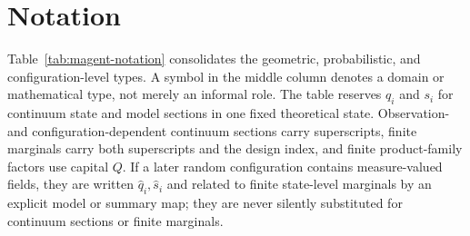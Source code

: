 \chapter{Notation}

Table~\ref{tab:magent-notation} consolidates the geometric, probabilistic, and configuration-level types. A symbol in the middle column denotes a domain or mathematical type, not merely an informal role. The table reserves \(q_i\) and \(s_i\) for continuum state and model sections in one fixed theoretical state. Observation- and configuration-dependent continuum sections carry superscripts, finite marginals carry both superscripts and the design index, and finite product-family factors use capital \(Q\). If a later random configuration contains measure-valued fields, they are written \(\widehat q_i,\widehat s_i\) and related to finite state-level marginals by an explicit model or summary map; they are never silently substituted for continuum sections or finite marginals.

